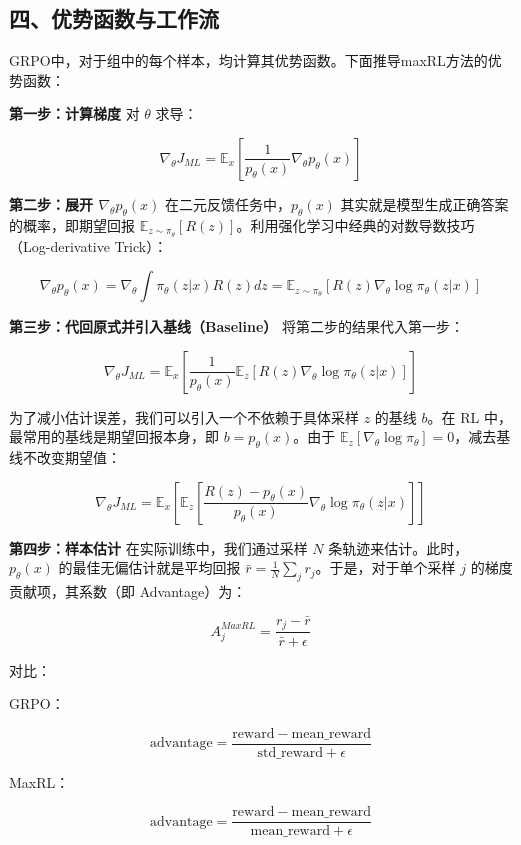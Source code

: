 \hypertarget{ux56dbux4f18ux52bfux51fdux6570ux4e0eux5de5ux4f5cux6d41}{%
\subsection{四、优势函数与工作流}\label{ux56dbux4f18ux52bfux51fdux6570ux4e0eux5de5ux4f5cux6d41}}

GRPO中，对于组中的每个样本，均计算其优势函数。下面推导maxRL方法的优势函数：

\textbf{第一步：计算梯度} 对 \(\theta\) 求导：

\[
\nabla_\theta J_{ML}=\mathbb{E}_x\left[\frac{1}{p_\theta(x)}\nabla_\theta p_\theta(x)\right]
\]

\textbf{第二步：展开 \(\nabla_\theta p_\theta(x)\)} 在二元反馈任务中，\(p_\theta(x)\) 其实就是模型生成正确答案的概率，即期望回报 \(\mathbb{E}_{z\sim\pi_\theta}[R(z)]\)。利用强化学习中经典的对数导数技巧（Log-derivative Trick）：

\[
\nabla_\theta p_\theta(x)=\nabla_\theta\int \pi_\theta(z|x)R(z)dz
=\mathbb{E}_{z\sim\pi_\theta}\left[R(z)\nabla_\theta\log \pi_\theta(z|x)\right]
\]

\textbf{第三步：代回原式并引入基线（Baseline）} 将第二步的结果代入第一步：

\[
\nabla_\theta J_{ML}=\mathbb{E}_x\left[\frac{1}{p_\theta(x)}\mathbb{E}_z\left[R(z)\nabla_\theta\log \pi_\theta(z|x)\right]\right]
\]

为了减小估计误差，我们可以引入一个不依赖于具体采样 \(z\) 的基线 \(b\)。在 RL 中，最常用的基线是期望回报本身，即 \(b=p_\theta(x)\)。由于 \(\mathbb{E}_z[\nabla_\theta\log\pi_\theta]=0\)，减去基线不改变期望值：

\[
\nabla_\theta J_{ML}=\mathbb{E}_x\left[\mathbb{E}_z\left[\frac{R(z)-p_\theta(x)}{p_\theta(x)}\nabla_\theta\log\pi_\theta(z|x)\right]\right]
\]

\textbf{第四步：样本估计} 在实际训练中，我们通过采样 \(N\) 条轨迹来估计。此时，\(p_\theta(x)\) 的最佳无偏估计就是平均回报 \(\bar{r}=\frac{1}{N}\sum_j r_j\)。于是，对于单个采样 \(j\) 的梯度贡献项，其系数（即 Advantage）为：

\[
A_j^{MaxRL}=\frac{r_j-\bar{r}}{\bar{r}+\epsilon}
\]

对比：

GRPO：

\[
\mathrm{advantage}=\frac{\mathrm{reward}-\mathrm{mean\_reward}}{\mathrm{std\_reward}+\epsilon}
\]

MaxRL：

\[
\mathrm{advantage}=\frac{\mathrm{reward}-\mathrm{mean\_reward}}{\mathrm{mean\_reward}+\epsilon}
\]

